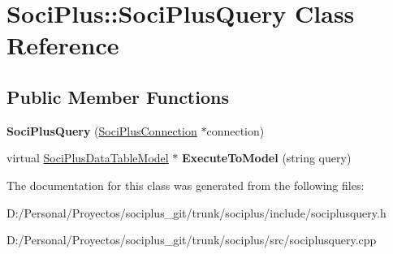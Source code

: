 \hypertarget{class_soci_plus_1_1_soci_plus_query}{\section{Soci\+Plus\+:\+:Soci\+Plus\+Query Class Reference}
\label{class_soci_plus_1_1_soci_plus_query}
}
\subsection*{Public Member Functions}
\begin{DoxyCompactItemize}
\item 
\hypertarget{class_soci_plus_1_1_soci_plus_query_a5a1db365cfb25a265a02451f7d7451ec}{{\bfseries Soci\+Plus\+Query} (\hyperlink{class_soci_plus_1_1_soci_plus_connection}{Soci\+Plus\+Connection} $\ast$connection)}\label{class_soci_plus_1_1_soci_plus_query_a5a1db365cfb25a265a02451f7d7451ec}

\item 
\hypertarget{class_soci_plus_1_1_soci_plus_query_a5420660fd7b62636c4bc3ce569418768}{virtual \hyperlink{class_soci_plus_1_1_soci_plus_data_table_model}{Soci\+Plus\+Data\+Table\+Model} $\ast$ {\bfseries Execute\+To\+Model} (string query)}\label{class_soci_plus_1_1_soci_plus_query_a5420660fd7b62636c4bc3ce569418768}

\end{DoxyCompactItemize}


The documentation for this class was generated from the following files\+:\begin{DoxyCompactItemize}
\item 
D\+:/\+Personal/\+Proyectos/sociplus\+\_\+git/trunk/sociplus/include/sociplusquery.\+h\item 
D\+:/\+Personal/\+Proyectos/sociplus\+\_\+git/trunk/sociplus/src/sociplusquery.\+cpp\end{DoxyCompactItemize}
